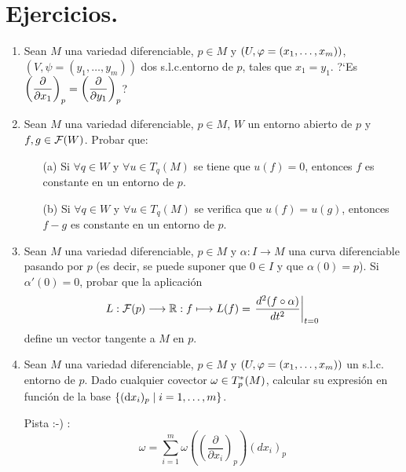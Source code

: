 \documentclass[Cursovd_portada.tex]{subfiles}
\begin{document}
\section{Ejercicios.}
\begin{enumerate}
\item Sean $M$ una variedad diferenciable, $p\in M$ y
$(U,\varphi=(x_1,\dots ,x_m))$, $(V,\psi=(y_1,\dots ,y_m))$ dos
s.l.c.entorno de $p$, tales que $x_1=y_1$. ?`Es
$\left(\displaystyle{\frac{\partial}{\partial x_1}}\right)_p=\left(\displaystyle{\frac{\partial}{\partial y_1}}\right)_p$? \item Sean $M$ una variedad
diferenciable, $p \in M$, $W$ un entorno abierto de $p$ y $f,g \in
{\cal F}(W)$. Probar que:
\begin{enumerate}
\item[(a)] Si $\forall q \in W$ y $\forall u \in T_q(M)$ se tiene
que $u(f) = 0$, entonces $f$ es constante en un entorno de $p$.
\item[(b)] Si $\forall q \in W$ y $\forall u \in T_q(M)$ se
verifica que $u(f) = u(g)$, entonces $f-g$ es constante en un
entorno de $p$.
\end{enumerate}
\item Sean $M$ una variedad diferenciable, $p \in M$ y
$\alpha:I\longrightarrow M$ una curva diferenciable pasando por
$p$ (es decir, se puede suponer que $0 \in I$ y que $\alpha(0) =
p$). Si $\alpha'(0) = 0$, probar que la aplicación $$L:{\cal
F}(p) \longrightarrow \mathbb{R}:f \longmapsto L(f) = \left.
\frac{d^2(f \circ \alpha)}{dt^2} \right |_{t=0}$$ define un vector
tangente a $M$ en $p$. \item Sean $M$ una variedad diferenciable,
$p\in M$ y $(U,\varphi=(x_1,\dots ,x_m))$ un s.l.c. entorno de $p$.
Dado cualquier covector $\omega\in T_p^*(M)$, calcular su
expresión en función de la base $\{({\rm d} x_i)_p\mid i=1,\dots
,m\}$.

Pista :-) :
\[ \omega = \sum_{i=1}^m \omega \left(\left(\frac{\partial}{\partial x_i}\right)_p\right) (dx_i)_p \]
\end{enumerate}
\end{document}
